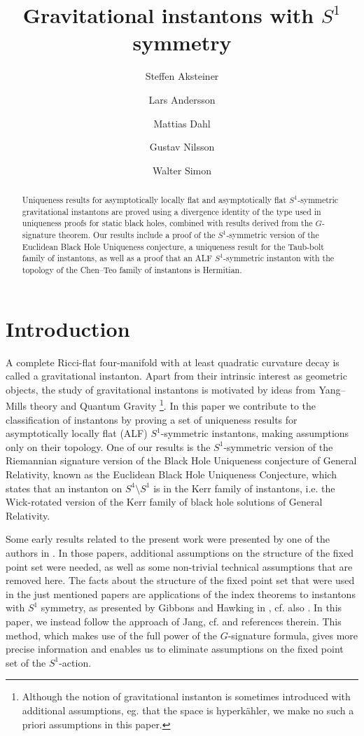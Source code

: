 \documentclass[a4paper,10pt,reqno]{amsart}
\title{Gravitational instantons with $S^1$ symmetry}
\author[S. Aksteiner]{Steffen Aksteiner}
\author[L. Andersson]{Lars Andersson}
\author[M. Dahl]{Mattias Dahl}
\author[G. Nilsson]{Gustav Nilsson}
\author[W. Simon]{Walter Simon}
\theoremstyle{plain}
\numberwithin{equation}{section}
\begin{document}
\begin{abstract}
Uniqueness results for asymptotically locally flat and asymptotically flat $S^1$-symmetric gravitational instantons are proved using a divergence identity of the type used in uniqueness proofs for static black holes, combined with results derived from the $G$-signature theorem. Our results include a proof of the $S^1$-symmetric version of the Euclidean Black Hole Uniqueness conjecture, a uniqueness result for the Taub-bolt family of instantons, as well as a proof that an ALF $S^1$-symmetric instanton with the topology of the Chen--Teo family of instantons is Hermitian.  
\end{abstract} 
\maketitle
\tableofcontents


\section{Introduction}\label{sec:intro}


A complete Ricci-flat four-manifold with at least quadratic curvature decay is called a gravitational instanton. Apart from their intrinsic interest as geometric objects, the study of gravitational instantons is motivated by ideas from Yang--Mills theory and Quantum Gravity   \cite{hawking:1977:grav:instantons}\footnote{Although the notion of gravitational instanton is sometimes introduced with additional assumptions, eg. that the space is hyperk\"ahler, we make no such a priori assumptions in this paper.}. %
%
%
%
%
In this paper we contribute to the classification of instantons by proving a set of uniqueness results for asymptotically locally flat (ALF) $S^1$-symmetric instantons, making assumptions only on their topology. One of our results is the $S^1$-symmetric version of the Riemannian signature version of the Black Hole Uniqueness conjecture of General Relativity, known as the Euclidean Black Hole Uniqueness Conjecture, which states that an instanton on $S^4\setminus S^1$ is in the Kerr family of instantons, i.e. the Wick-rotated version of the Kerr family of black hole solutions of General Relativity.  
 
 
%
%
%
%
Some early results related to the present work were presented by one of the authors in \cite{simon:1995,mars:simon:1999}. In those papers,  additional assumptions on the structure of the fixed point set were needed, as well as some non-trivial technical assumptions that are removed here. The facts about the structure of the fixed point set that were used in the just mentioned papers are applications of the index theorems  to instantons with $S^1$ symmetry, as presented by Gibbons and Hawking in \cite{gibbons:hawking:1979}, cf. also \cite{1979NuPhB.157..377G}. In this paper, we instead follow the approach of 
%
%
Jang, cf.  \cite{2018JGP...133..181J} and references therein.
%
This method, which makes use of the full power of the $G$-signature formula, gives more precise information and enables us to eliminate assumptions on the fixed point set of the $S^1$-action.
\end{document}
